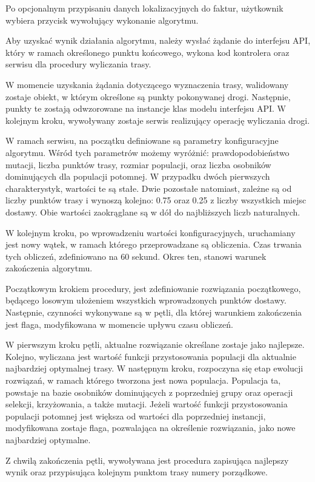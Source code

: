 Po opcjonalnym przypisaniu danych lokalizacyjnych do faktur, użytkownik wybiera przycisk wywołujący wykonanie algorytmu.

Aby uzyskać wynik działania algorytmu, należy wysłać żądanie do interfejsu API, który w ramach określonego punktu końcowego, wykona kod kontrolera oraz serwisu dla procedury wyliczania trasy.

W momencie uzyskania żądania dotyczącego wyznaczenia trasy, walidowany zostaje obiekt, w którym określone są punkty pokonywanej drogi. Następnie, punkty te zostają odwzorowane na instancje klas modelu interfejsu API. W kolejnym kroku, wywoływany zostaje serwis realizujący operację wyliczania drogi.

W ramach serwisu, na początku definiowane są parametry konfiguracyjne algorytmu. Wśród tych parametrów możemy wyróżnić: prawdopodobieństwo mutacji, liczba punktów trasy, rozmiar populacji, oraz liczba osobników dominujących dla populacji potomnej. W przypadku dwóch pierwszych charakterystyk, wartości te są stałe. Dwie pozostałe natomiast, zależne są od liczby punktów trasy i wynoszą kolejno: 0.75 oraz 0.25 z liczby wszystkich miejsc dostawy. Obie wartości zaokrąglane są w dół do najbliższych liczb naturalnych.

W kolejnym kroku, po wprowadzeniu wartości konfiguracyjnych, uruchamiany jest nowy wątek, w ramach którego przeprowadzane są obliczenia. Czas trwania tych obliczeń, zdefiniowano na 60 sekund. Okres ten, stanowi warunek zakończenia algorytmu.

Początkowym krokiem procedury, jest zdefiniowanie rozwiązania początkowego, będącego losowym ułożeniem wszystkich wprowadzonych punktów dostawy. Następnie, czynności wykonywane są w pętli, dla której warunkiem zakończenia jest flaga, modyfikowana w momencie upływu czasu obliczeń.

W pierwszym kroku pętli, aktualne rozwiązanie określane zostaje jako najlepsze. Kolejno, wyliczana jest wartość funkcji przystosowania populacji dla aktualnie najbardziej optymalnej trasy. W następnym kroku, rozpoczyna się etap ewolucji rozwiązań, w ramach którego tworzona jest nowa populacja. Populacja ta, powstaje na bazie osobników dominujących z poprzedniej grupy oraz operacji selekcji, krzyżowania, a także mutacji. Jeżeli wartość funkcji przystosowania populacji potomnej jest większa od wartości dla poprzedniej instancji, modyfikowana zostaje flaga, pozwalająca na określenie rozwiązania, jako nowe najbardziej optymalne.

Z chwilą zakończenia pętli, wywoływana jest procedura zapisująca najlepszy wynik oraz przypisująca kolejnym punktom trasy numery porządkowe.

